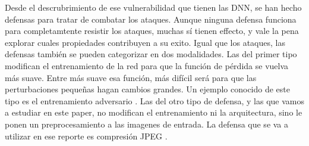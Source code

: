 Desde el descrubrimiento de ese vulnerabilidad que tienen las DNN, se han hecho defensas para tratar de combatar los ataques. Aunque ninguna defensa funciona para completamtente resistir los ataques, muchas sí tienen effecto, y vale la pena explorar cuales propiedades contribuyen a su exito. Igual que los ataques, las defensas también se pueden categorizar en dos modalidades. Las del primer tipo modifican el entrenamiento de la red para que la función de pérdida se vuelva más suave. Entre más suave esa función, más difícil será para que las perturbaciones pequeñas hagan cambios grandes. Un ejemplo conocido de este tipo es el entrenamiento adversario \cite{goodfellow2015explaining, Shaham_2018, szegedy2014intriguing}. Las del otro tipo de defensa, y las que vamos a estudiar en este paper, no modifican el entrenamiento ni la arquitectura, sino le ponen un preprocesamiento a las imagenes de entrada. La defensa que se va a utilizar en ese reporte es compresión JPEG \cite{das2017keeping}.




